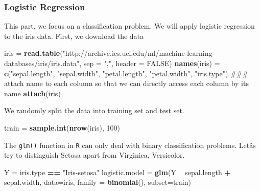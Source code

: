 \documentclass[]{article}
\newenvironment{Shaded}{\begin{snugshade}}{\end{snugshade}}
\newcommand{\KeywordTok}[1]{\textcolor[rgb]{0.13,0.29,0.53}{\textbf{#1}}}
\newcommand{\DataTypeTok}[1]{\textcolor[rgb]{0.13,0.29,0.53}{#1}}
\newcommand{\DecValTok}[1]{\textcolor[rgb]{0.00,0.00,0.81}{#1}}
\newcommand{\StringTok}[1]{\textcolor[rgb]{0.31,0.60,0.02}{#1}}
\newcommand{\OtherTok}[1]{\textcolor[rgb]{0.56,0.35,0.01}{#1}}
\newcommand{\OperatorTok}[1]{\textcolor[rgb]{0.81,0.36,0.00}{\textbf{#1}}}
\newcommand{\NormalTok}[1]{#1}
\begin{document}
\subsubsection{Logistic Regression}\label{logistic-regression}

This part, we focus on a classification problem. We will apply logistic
regression to the iris data. First, we download the data

\begin{Shaded}
\begin{Highlighting}[]
\NormalTok{iris =}\StringTok{ }\KeywordTok{read.table}\NormalTok{(}\StringTok{"http://archive.ics.uci.edu/ml/machine-learning-databases/iris/iris.data"}\NormalTok{, }\DataTypeTok{sep =} \StringTok{","}\NormalTok{, }\DataTypeTok{header =} \OtherTok{FALSE}\NormalTok{)}
\KeywordTok{names}\NormalTok{(iris) =}\StringTok{ }\KeywordTok{c}\NormalTok{(}\StringTok{"sepal.length"}\NormalTok{, }\StringTok{"sepal.width"}\NormalTok{, }\StringTok{"petal.length"}\NormalTok{, }\StringTok{"petal.width"}\NormalTok{, }\StringTok{"iris.type"}\NormalTok{)}
\NormalTok{### attach name to each column so that we can directly access each column by its name}
\KeywordTok{attach}\NormalTok{(iris)}
\end{Highlighting}
\end{Shaded}

We randomly split the data into training set and test set.

\begin{Shaded}
\begin{Highlighting}[]
\NormalTok{train =}\StringTok{ }\KeywordTok{sample.int}\NormalTok{(}\KeywordTok{nrow}\NormalTok{(iris), }\DecValTok{100}\NormalTok{)}
\end{Highlighting}
\end{Shaded}

The \texttt{glm()} function in \texttt{R} can only deal with binary
classification problems. Letâs try to distinguish Setosa apart from
Virginica, Versicolor.

\begin{Shaded}
\begin{Highlighting}[]
\NormalTok{Y =}\StringTok{ }\NormalTok{iris.type }\OperatorTok{==}\StringTok{ "Iris-setosa"}
\NormalTok{logistic.model =}\StringTok{ }\KeywordTok{glm}\NormalTok{(Y }\OperatorTok{~}\StringTok{ }\NormalTok{sepal.length }\OperatorTok{+}\StringTok{ }\NormalTok{sepal.width, }\DataTypeTok{data=}\NormalTok{iris, }\DataTypeTok{family =} \KeywordTok{binomial}\NormalTok{(), }\DataTypeTok{subset=}\NormalTok{train)}
\end{Highlighting}
\end{Shaded}
\end{document}
